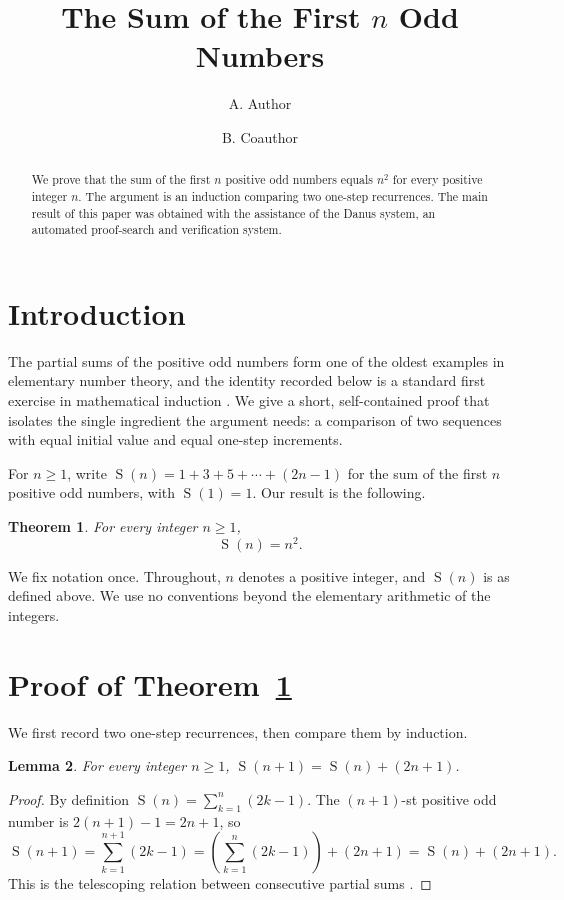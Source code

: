 \documentclass{amsart}
\title{The Sum of the First $n$ Odd Numbers}
\author{A. Author}
\author{B. Coauthor}
\date{}
\theoremstyle{plain}
\newtheorem{thm}{Theorem}[section]
\newtheorem{lem}[thm]{Lemma}
\theoremstyle{definition}
\theoremstyle{remark}
\DeclareMathOperator{\Oddsum}{S}
\begin{document}
\begin{abstract}
We prove that the sum of the first $n$ positive odd numbers equals $n^2$ for every positive integer $n$. The argument is an induction comparing two one-step recurrences. The main result of this paper was obtained with the assistance of the Danus system, an automated proof-search and verification system.
\end{abstract}

\maketitle

\section{Introduction}\label{sec:introduction}

The partial sums of the positive odd numbers form one of the oldest examples in elementary number theory, and the identity recorded below is a standard first exercise in mathematical induction \cite{Exm20}. We give a short, self-contained proof that isolates the single ingredient the argument needs: a comparison of two sequences with equal initial value and equal one-step increments.

For $n \ge 1$, write $\Oddsum(n) = 1 + 3 + 5 + \cdots + (2n-1)$ for the sum of the first $n$ positive odd numbers, with $\Oddsum(1) = 1$. Our result is the following.

\begin{thm}\label{thm:main}
For every integer $n \ge 1$,
\[
  \Oddsum(n) = n^2.
\]
\end{thm}

We fix notation once. Throughout, $n$ denotes a positive integer, and $\Oddsum(n)$ is as defined above. We use no conventions beyond the elementary arithmetic of the integers.

\section{Proof of Theorem~\ref{thm:main}}\label{sec:proof}

We first record two one-step recurrences, then compare them by induction.

\begin{lem}\label{lem:odd-recurrence}
For every integer $n \ge 1$, $\Oddsum(n+1) = \Oddsum(n) + (2n+1)$.
\end{lem}

\begin{proof}
By definition $\Oddsum(n) = \sum_{k=1}^{n} (2k-1)$. The $(n+1)$-st positive odd number is $2(n+1)-1 = 2n+1$, so
\[
  \Oddsum(n+1) = \sum_{k=1}^{n+1} (2k-1) = \left( \sum_{k=1}^{n} (2k-1) \right) + (2n+1) = \Oddsum(n) + (2n+1).
\]
This is the telescoping relation between consecutive partial sums \cite{AC24}.
\end{proof}
\end{document}

